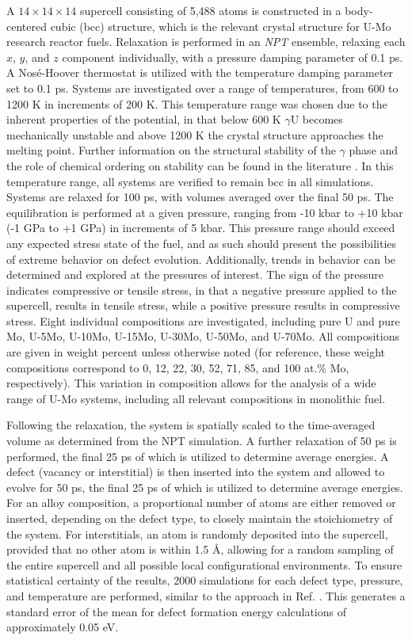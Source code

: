 \documentclass[review]{elsarticle}
\begin{document}
A $14 \times 14 \times 14$ supercell consisting of 5,488 atoms is constructed in a body-centered cubic (bcc) structure, which is the relevant crystal structure for U-Mo research reactor fuels. Relaxation is performed in an \textit{NPT} ensemble, relaxing each $x$, $y$, and $z$ component individually, with a pressure damping parameter of 0.1 ps. A Nos\'e-Hoover thermostat is utilized with the temperature damping parameter set to 0.1 ps. Systems are investigated over a range of temperatures, from 600 to 1200 K in increments of 200 K. This temperature range was chosen due to the inherent properties of the potential, in that below 600 K $\gamma$U becomes mechanically unstable and above 1200 K the crystal structure approaches the melting point. Further information on the structural stability of the $\gamma$ phase and the role of chemical ordering on stability can be found in the literature \cite{chaney2021, soderlind2012}. In this temperature range, all systems are verified to remain bcc in all simulations. Systems are relaxed for 100 ps, with volumes averaged over the final 50 ps. The equilibration is performed at a given pressure, ranging from -10 kbar to +10 kbar (-1 GPa to +1 GPa) in increments of 5 kbar. This pressure range should exceed any expected stress state of the fuel, and as such should present the possibilities of extreme behavior on defect evolution. Additionally, trends in behavior can be determined and explored at the pressures of interest. The sign of the pressure indicates compressive or tensile stress, in that a negative pressure applied to the supercell, results in tensile stress, while a positive pressure results in compressive stress. Eight individual compositions are investigated, including pure U and pure Mo, U-5Mo, U-10Mo, U-15Mo, U-30Mo, U-50Mo, and U-70Mo. All compositions are given in weight percent unless otherwise noted (for reference, these weight compositions correspond to 0, 12, 22, 30, 52, 71, 85, and 100 at.\% Mo, respectively). This variation in composition allows for the analysis of a wide range of U-Mo systems, including all relevant compositions in monolithic fuel.  

Following the relaxation, the system is spatially scaled to the time-averaged volume as determined from the NPT simulation. A further relaxation of 50 ps is performed, the final 25 ps of which is utilized to determine average energies. A defect (vacancy or interstitial) is then inserted into the system and allowed to evolve for 50 ps, the final 25 ps of which is utilized to determine average energies. For an alloy composition, a proportional number of atoms are either removed or inserted, depending on the defect type, to closely maintain the stoichiometry of the system. For interstitials, an atom is randomly deposited into the supercell, provided that no other atom is within 1.5 \r{A}, allowing for a random sampling of the entire supercell and all possible local configurational environments. To ensure statistical certainty of the results, 2000 simulations for each defect type, pressure, and temperature are performed, similar to the approach in Ref. \cite{zhang2021}. This generates a standard error of the mean for defect formation energy calculations of approximately 0.05 eV.
\end{document}
